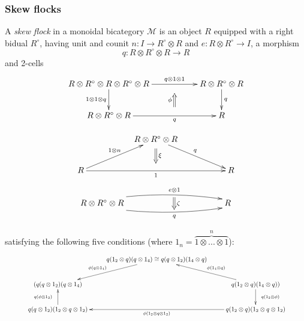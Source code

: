 \documentclass{beamer}
\def\CM{{\mathscr M}}
\begin{document}
\begin{frame}
  \frametitle{Skew flocks}
A {\itshape skew flock} in a monoidal bicategory $\CM$ is an object $R$ equipped
with a right bidual $R^{\circ }$, having unit and counit $n:I\longrightarrow
R^{\circ }\otimes R$ and $e:R\otimes R^{\circ }\longrightarrow I$,
a morphism
\begin{equation*}
q:R\otimes R^{\circ }\otimes R\longrightarrow R%
\end{equation*}
and 2-cells
\begin{gather}
\begin{split}
\xymatrix{
R\otimes R^{\circ} \otimes R\otimes R^{\circ} \otimes R \ar[d]_-{1\otimes 1\otimes q} \ar[rr]^-{q\otimes 1 \otimes 1}_-{\phantom{A}}="1"  &&  R\otimes R^{\circ} \otimes R \ar[d]^-{q} \\
R\otimes R^{\circ} \otimes R \ar[rr]_-{q}^-{\phantom{A}}="2" \ar@{<=}"1";"2"_{\phi} && R
} 
\end{split}
\label{phi}
\end{gather}
\end{frame}
\begin{frame}
\begin{gather}
\begin{split}
\xymatrix{
\ar@{}[rrrr]_{\phantom{A}}="1" && R\otimes R^{\circ} \otimes R \ar[rrd]^{q} && \\
R \ar[rru]^{1\otimes n} \ar[rrrr]_-{1}^{\phantom{a}}="2" \ar@{=>}"1";"2"^{\xi}  &&  &&  R 
}
\end{split}
\label{xi}
\end{gather}
\begin{equation}
\begin{split}
\xymatrix{
R \otimes R^{\circ} \otimes R \ar@/^/@<+1ex>[rrrr]^-{e\otimes 1}_-{}="1" \ar@/_/@<-1ex>[rrrr]_-{q}^-{}="2" \ar@{=>}"1";"2"^{\zeta} &&&& R 
}
\end{split}
\label{zeta}
\end{equation}
\end{frame}
\begin{frame}
\noindent satisfying the following five conditions (where $1_{n}=\overbrace{1\otimes . . . \otimes 1}^{n}$):
\begin{gather*}
\begin{split}
\scalebox{0.7489}{
\xymatrix{
\ar@{}[rr]_-{\phantom{a}}="1" & q(1_{2}\otimes q)( q\otimes 1_{4}) \cong q(q\otimes 1_{2})( 1_{4}\otimes q) \ar@{<-}[rd]^-{\phantom{AAA}\phi (1_{4}\otimes q)} & \\
(q( q\otimes 1_{2})(q\otimes 1_{4}) \ar@{<-}[ru]^-{\phi (q\otimes 1_{4})\phantom{AAA}} \ar@{<-}[d]_-{q(\phi\otimes 1_{2})\phantom{A}} && q( 1_{2}\otimes q)( 1_{4}\otimes q)) \\
q( q\otimes 1_{2})(1_{2}\otimes q\otimes 1_{2}) \ar@{<-}[rr]_-{\phi(1_{2}\otimes q\otimes 1_{2})}="2" && q( 1_{2}\otimes q)( 1_{2}\otimes q\otimes 1_{2})  \ar@{<-}[u]_{\phantom{A}q( 1_{2}\otimes \phi)}
\ar@{}"1";"2"|*=0-{}
}
}
\end{split}
\end{gather*}
\end{frame}
\end{document}
